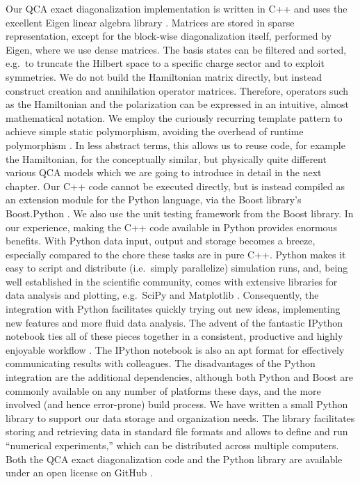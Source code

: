Our QCA exact diagonalization implementation is written in C++ and uses the
excellent Eigen linear algebra library \cite{eigen}. Matrices are stored in
sparse representation, except for the block-wise diagonalization itself,
performed by Eigen, where we use dense matrices. The basis states can be
filtered and sorted, e.g.\ to truncate the Hilbert space to a specific charge
sector and to exploit symmetries. We do not build the Hamiltonian matrix
directly, but instead construct creation and annihilation operator matrices.
Therefore, operators such as the Hamiltonian and the polarization can be
expressed in an intuitive, almost mathematical notation. We employ the curiously
recurring template pattern to achieve simple static polymorphism, avoiding the
overhead of runtime polymorphism \cite{andrei2001modern}. In less abstract
terms, this allows us to reuse code, for example the Hamiltonian, for the
conceptually similar, but physically quite different various QCA models which we
are going to introduce in detail in the next chapter. Our C++ code cannot be
executed directly, but is instead compiled as an extension module for the Python
language, via the Boost library's Boost.Python \cite{boost}. We also use the
unit testing framework from the Boost library. In our experience, making the C++
code available in Python provides enormous benefits. With Python data input,
output and storage becomes a breeze, especially compared to the chore these
tasks are in pure C++. Python makes it easy to script and distribute (i.e.\
simply parallelize) simulation runs, and, being well established in the
scientific community, comes with extensive libraries for data analysis and
plotting, e.g.\ SciPy and Matplotlib \cite{scipy} \cite{hunter2007matplotlib}.
Consequently, the integration with Python facilitates quickly trying out new
ideas, implementing new features and more fluid data analysis. The advent of the
fantastic IPython notebook ties all of these pieces together in a consistent,
productive and highly enjoyable workflow \cite{perez2007ipython}. The IPython
notebook is also an apt format for effectively communicating results with
colleagues. The disadvantages of the Python integration are the additional
dependencies, although both Python and Boost are commonly available on any
number of platforms these days, and the more involved (and hence error-prone)
build process. We have written a small Python library to support our data
storage and organization needs. The library facilitates storing and retrieving
data in standard file formats and allows to define and run ``numerical
experiments,'' which can be distributed across multiple computers. Both the QCA
exact diagonalization code and the Python library are available under an open
license on GitHub \cite{githubqca} \cite{githubcoma}.




















